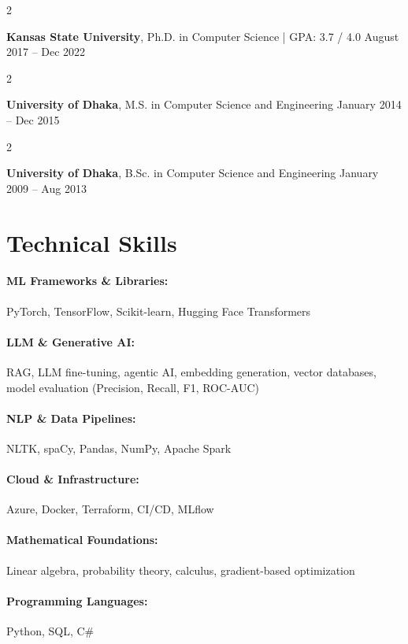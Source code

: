 \documentclass[10pt, letterpaper]{article}
\newenvironment{twocolentry}[2][]{
    \onecolentry
    \def\secondColumn{#2}
    \setcolumnwidth{\fill, 4.5 cm}
    \begin{paracol}{2}
}{
    \switchcolumn \raggedleft \secondColumn
    \end{paracol}
    \endonecolentry
}
\begin{document}
        \begin{twocolentry}{
            August 2017 -- Dec 2022
        }
            \textbf{Kansas State University}, Ph.D. in Computer Science | GPA: 3.7 / 4.0\end{twocolentry}

        \begin{twocolentry}{
            January 2014 -- Dec 2015
        }
            \textbf{University of Dhaka}, M.S. in Computer Science and Engineering\end{twocolentry}

        \begin{twocolentry}{
            January 2009 -- Aug 2013
        }
            \textbf{University of Dhaka}, B.Sc. in Computer Science and Engineering\end{twocolentry}

\vspace{-1mm}
\section{Technical Skills}

        \paragraph{ML Frameworks \& Libraries:} PyTorch, TensorFlow, Scikit-learn, Hugging Face Transformers
        \vspace{-4mm}
        \paragraph{LLM \& Generative AI:} RAG, LLM fine-tuning, agentic AI, embedding generation, vector databases, model evaluation (Precision, Recall, F1, ROC-AUC)
        \vspace{-4mm}
        \paragraph{NLP \& Data Pipelines:} NLTK, spaCy, Pandas, NumPy, Apache Spark
        \vspace{-4mm}
        \paragraph{Cloud \& Infrastructure:} Azure, Docker, Terraform, CI/CD, MLflow
        \vspace{-4mm}
        \paragraph{Mathematical Foundations:} Linear algebra, probability theory, calculus, gradient-based optimization
        \vspace{-4mm}
        \paragraph{Programming Languages:} Python, SQL, C\#
\end{document}

